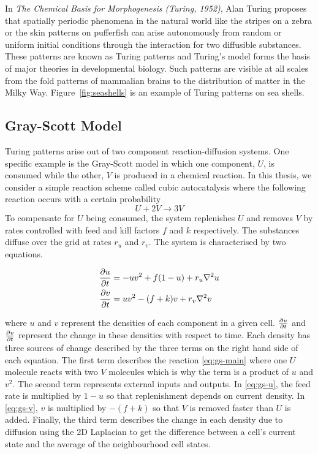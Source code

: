 In \textit{The Chemical Basis for Morphogenesis (Turing, 1952)}\cite{turing1990chemical}, Alan Turing proposes that spatially periodic phenomena in the natural world like the stripes on a zebra or the skin patterns on pufferfish can arise autonomously from random or uniform initial conditions through the interaction for two diffusible substances. These patterns are known as Turing patterns and Turing's model forms the basis of major theories in developmental biology. Such patterns are visible at all scales from the fold patterns of mammalian brains\cite{cartwright2002labyrinthine} to the distribution of matter in the Milky Way\cite{smolin1996galactic}. Figure~\ref{fig:seashells} is an example of Turing patterns on sea shells.

\subsection{Gray-Scott Model}

Turing patterns arise out of two component reaction-diffusion systems. One specific example is the Gray-Scott model\cite{gray1983autocatalytic} in which one component, $U$, is consumed while the other, $V$ is produced in a chemical reaction. In this thesis, we consider a simple reaction scheme called cubic autocatalysis where the following reaction occurs with a certain probability
\begin{equation}\label{eq:gs-main}
  U + 2V \rightarrow 3V
\end{equation}
To compensate for $U$ being consumed, the system replenishes $U$ and removes $V$ by rates controlled with feed and kill factors $f$ and $k$ respectively. The substances diffuse over the grid at rates $r_u$ and $r_v$. The system is characterised by two equations.
\begin{definition} \label{def:reaction-diffusion}
\begin{align} 
  \label{eq:gs-u} \pdv{u}{t} &= -uv^2 + f(1-u) + r_u \nabla^2 u\\
  \label{eq:gs-v} \pdv{v}{t} &= uv^2 - (f+k)v + r_v \nabla^2 v
\end{align}
\end{definition}
where $u$ and $v$ represent the densities of each component in a given cell. $\pdv{u}{t}$ and $\pdv{v}{t}$ represent the change in these densities with respect to time. Each density has three sources of change described by the three terms on the right hand side of each equation. The first term describes the reaction \ref{eq:gs-main} where one $U$ molecule reacts with two $V$ molecules which is why the term is a product of $u$ and $v^2$. The second term represents external inputs and outputs. In \ref{eq:gs-u}, the feed rate is multiplied by $1-u$ so that replenishment depends on current density. In \ref{eq:gs-v}, $v$ is multiplied by $-(f+k)$ so that $V$ is removed faster than $U$ is added. Finally, the third term describes the change in each density due to diffusion using the 2D Laplacian to get the difference between a cell's current state and the average of the neighbourhood cell states.\\

